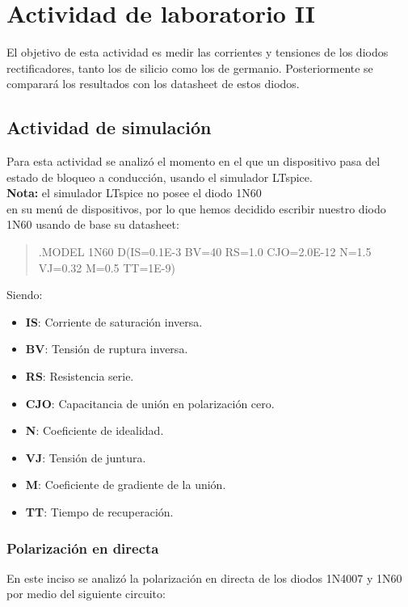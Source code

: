\section{Actividad de laboratorio II}

\sangria{} El objetivo de esta actividad es medir las corrientes y tensiones de los diodos rectificadores, tanto los de silicio como los de germanio. Posteriormente se comparará los resultados con los datasheet de estos diodos.

\subsection{Actividad de simulación}

\sangria{} Para esta actividad se analizó el momento en el que un dispositivo pasa del estado de bloqueo a conducción, usando el simulador LTspice.\\

\textbf{Nota:} el simulador LTspice no posee el diodo 1N60 \\ en su menú de dispositivos, por lo que hemos decidido escribir nuestro diodo 1N60 usando de base su datasheet:

\begin{quote}
    \ttfamily
    .MODEL 1N60 D(IS=0.1E-3 BV=40 RS=1.0 CJO=2.0E-12 N=1.5 VJ=0.32 M=0.5 TT=1E-9)
\end{quote}

Siendo:
\begin{itemize}[noitemsep, topsep = 0pt]
    \item \textbf{IS}: Corriente de saturación inversa.
    \item \textbf{BV}: Tensión de ruptura inversa.
    \item \textbf{RS}: Resistencia serie.
    \item \textbf{CJO}: Capacitancia de unión en polarización cero.
    \item \textbf{N}: Coeficiente de idealidad.
    \item \textbf{VJ}: Tensión de juntura.
    \item \textbf{M}: Coeficiente de gradiente de la unión.
    \item \textbf{TT}: Tiempo de recuperación.
\end{itemize}
\subsubsection{Polarización en directa}
\sangria{} En este inciso se analizó la polarización en directa de los diodos 1N4007 y 1N60 por medio del siguiente circuito:

